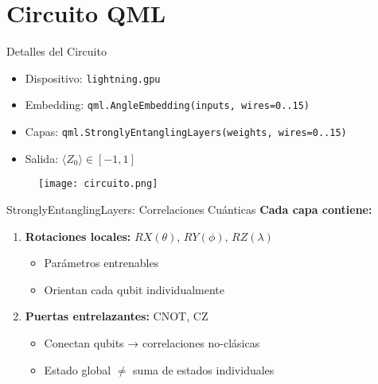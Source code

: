 \documentclass{beamer}
\begin{document}
\section{Circuito QML}
\begin{frame}{Detalles del Circuito}
  \begin{itemize}
    \item Dispositivo: \texttt{lightning.gpu}
    \item Embedding: \texttt{qml.AngleEmbedding(inputs, wires=0..15)}
    \item Capas: \texttt{qml.StronglyEntanglingLayers(weights, wires=0..15)}
    \item Salida: $\langle Z_0\rangle \in [-1,1]$
  \end{itemize}
  \vspace{1em}
  \begin{figure}
    \centering
    \texttt{[image: circuito.png]}
  \end{figure}
\end{frame}


\begin{frame}{StronglyEntanglingLayers: Correlaciones Cuánticas}
  \textbf{Cada capa contiene:}
  \begin{enumerate}
    \item \textbf{Rotaciones locales:} $RX(\theta)$, $RY(\phi)$, $RZ(\lambda)$ 
    \begin{itemize}
      \item Parámetros entrenables
      \item Orientan cada qubit individualmente
    \end{itemize}
    
    \item \textbf{Puertas entrelazantes:} CNOT, CZ
    \begin{itemize}
      \item Conectan qubits → correlaciones no-clásicas
      \item Estado global $\neq$ suma de estados individuales
    \end{itemize}
  \end{enumerate}

\end{frame}
\end{document}
